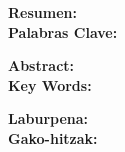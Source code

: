 \begin{itshape}
    \textbf{Resumen:} \\
    
    \textbf{Palabras Clave: }
\end{itshape}
\newpage

\begin{itshape}
    \textbf{Abstract:} \\

    \textbf{Key Words: }
\end{itshape}
\newpage

\begin{itshape}
    \textbf{Laburpena:} \\

    \textbf{Gako-hitzak: }
\end{itshape}

\newpage


